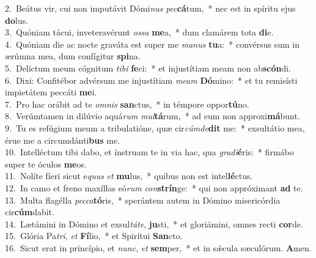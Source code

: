 {2.~}Beátus vir, cui non imputávit Dómi\textit{nus} \textit{pec}\textbf{cá}tum,~* nec est in spíritu ejus \textbf{do}lus.\\
{3.~}Quóniam tácui, inveteravérunt \textit{os}\textit{sa} \textbf{me}a,~* dum clamárem tota \textbf{di}e.\\
{4.~}Quóniam die ac nocte graváta est super me \textit{ma}\textit{nus} \textbf{tu}a:~* convérsus sum in ærúmna mea, dum confígitur \textbf{spi}na.\\
{5.~}Delíctum meum cógnitum \textit{ti}\textit{bi} \textbf{fe}ci:~* et injustítiam meam non ab\textbf{scón}di.\\
{6.~}Dixi: Confitébor advérsum me injustítiam \textit{me}\textit{am} \textbf{Dó}mino:~* et tu remisísti impietátem peccáti \textbf{me}i.\\
{7.~}Pro hac orábit ad te \textit{om}\textit{nis} \textbf{san}ctus,~* in témpore oppor\textbf{tú}no.\\
{8.~}Verúmtamen in dilúvio aquá\textit{rum} \textit{mul}\textbf{tá}rum,~* ad eum non approxi\textbf{má}bunt.\\
{9.~}Tu es refúgium meum a tribulatióne, quæ cir\textit{cúm}\textit{de}\textbf{dit} me:~* exsultátio mea, érue me a circumdánti\textbf{bus} me.\\
{10.~}Intelléctum tibi dabo, et ínstruam te in via hac, qua \textit{gra}\textit{di}\textbf{é}ris:~* firmábo super te óculos \textbf{me}os.\\
{11.~}Nolíte fíeri sicut e\textit{quus} \textit{et} \textbf{mu}lus,~* quibus non est intel\textbf{lé}ctus.\\
{12.~}In camo et freno maxíllas eó\textit{rum} \textit{con}\textbf{strín}ge:~* qui non appróximant \textbf{ad} te.\\
{13.~}Multa flagélla \textit{pec}\textit{ca}\textbf{tó}ris,~* sperántem autem in Dómino misericórdia cir\textbf{cúm}dabit.\\
{14.~}Lætámini in Dómino et exsul\textit{tá}\textit{te}, \textbf{ju}sti,~* et gloriámini, omnes recti \textbf{cor}de.\\
{15.~}Glória Pa\textit{tri}, \textit{et} \textbf{Fí}lio,~* et Spirítui \textbf{San}cto.\\
{16.~}Sicut erat in princípio, et \textit{nunc}, \textit{et} \textbf{sem}per,~* et in sǽcula sæculórum. \textbf{A}men.\\

